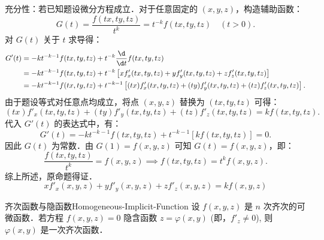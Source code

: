 \begin{myproof}
    充分性：若已知题设微分方程成立．对于任意固定的 $(x, y, z)$，构造辅助函数：
    \begin{equation}
        G(t) = \frac{f(tx, ty, tz)}{t^k} = t^{-k} f(tx, ty, tz) \quad (t > 0).
    \end{equation}
    对 $G(t)$ 关于 $t$ 求导得：
    \begin{equation}
        \begin{aligned}
            G'(t) & = -k t^{-k-1} f(tx, ty, tz) + t^{-k} \frac{\d}{\d t} f(tx, ty, tz)                                                           \\
                  & = -k t^{-k-1} f(tx, ty, tz) + t^{-k} \left[ x f'_x(tx, ty, tz) + y f'_y(tx, ty, tz) + z f'_z(tx, ty, tz) \right]             \\
                  & = -k t^{-k-1} f(tx, ty, tz) + t^{-k-1} \left[ (tx) f'_x(tx, ty, tz) + (ty) f'_y(tx, ty, tz) + (tz) f'_z(tx, ty, tz) \right].
        \end{aligned}
    \end{equation}
    由于题设等式对任意点均成立，将点 $(x, y, z)$ 替换为 $(tx, ty, tz)$ 可得：
    \begin{equation}
        (tx) f'_x(tx, ty, tz) + (ty) f'_y(tx, ty, tz) + (tz) f'_z(tx, ty, tz) = k f(tx, ty, tz).
    \end{equation}
    代入 $G'(t)$ 的表达式中，有：
    \begin{equation}
        G'(t) = -k t^{-k-1} f(tx, ty, tz) + t^{-k-1} \left[ k f(tx, ty, tz) \right] = 0.
    \end{equation}
    因此 $G(t)$ 为常数．由 $G(1) = f(x, y, z)$ 可知 $G(t) = f(x, y, z)$，即：
    \begin{equation}
        \frac{f(tx, ty, tz)}{t^k} = f(x, y, z) \implies f(tx, ty, tz) = t^k f(x, y, z).
    \end{equation}
    综上所述，原命题得证．
    \begin{equation}
        \boxed{x f'_x(x, y, z) + y f'_y(x, y, z) + z f'_z(x, y, z) = k f(x, y, z)}
    \end{equation}
\end{myproof}


\begin{problem}{齐次函数与隐函数}{Homogeneous-Implicit-Function}
    设 $f(x,y,z)$ 是 $n$ 次齐次的可微函数．若方程 $f(x,y,z) = 0$ 隐含函数 $z = \varphi(x,y)$ (即，$f'_z \neq 0$), 则 $\varphi(x,y)$ 是一次齐次函数．
\end{problem}

